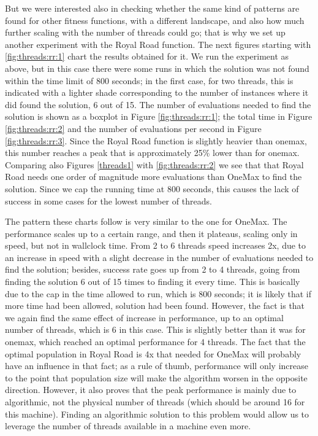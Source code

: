 \documentclass[sigconf]{acmart}\usepackage[]{graphicx}\usepackage[]{color}
\begin{document}
But we were interested also in checking whether the same kind of
patterns are found for other fitness functions, with a different
landscape, and also how much further scaling with the number of
threads could go; that is why we set up another experiment with the
Royal Road function. The next figures starting with \ref{fig:threads:rr:1} chart the results obtained for it. We run the experiment as above, but in this case there were
some runs in which the solution was not found within the time limit of
800 seconds; in the first case, for two threads, this is indicated
with a lighter shade corresponding to the number of instances where it
did found the solution, 6 out of 15. The number of evaluations needed
to find the solution is shown as a boxplot in Figure
\ref{fig:threads:rr:1}; the total time in Figure
\ref{fig:threads:rr:2} and the number of evaluations per second in
Figure \ref{fig:threads:rr:3}. Since the Royal Road function is
slightly heavier than onemax, this number reaches a peak that is
approximately 25\% lower than for onemax. Comparing also Figures
\ref{threads1} with \ref{fig:threads:rr:2} we see that that Royal Road
needs one order of magnitude more evaluations than OneMax to find the
solution. Since we cap the running time at 800 seconds, this causes
the lack of success in some cases for the lowest number of threads.

The pattern these charts follow is very similar to the one for
OneMax. The performance scales up to a certain range, and then it
plateaus, scaling only in speed, but not in wallclock time. From 2 to
6 threads speed increases 2x, due to an increase in speed with a
slight decrease in the number of evaluations needed to find the
solution; besides, success rate goes up from 2 to 4 threads, going
from finding the solution 6 out of 15 times to finding it every
time. This is basically due to the cap in the time allowed to run,
which is 800 seconds; it is likely that if more time had been allowed,
solution had been found. However, the fact is that we again find the
same effect of increase in performance, up to an optimal number of
threads, which is 6 in this case. This is slightly better than it was
for onemax, which reached an optimal performance for 4 threads. The
fact that the optimal population in Royal Road is 4x that needed for
OneMax will probably have an influence in that fact; as a rule of
thumb, performance will only increase to the point that population
size will make the algorithm worsen in the opposite
direction. However, it also proves that the peak performance is mainly
due to algorithmic, not the physical number of threads (which should
be around 16 for this machine). Finding an algorithmic solution to
this problem would allow us to leverage the number of threads
available in a machine even more.
\end{document}
